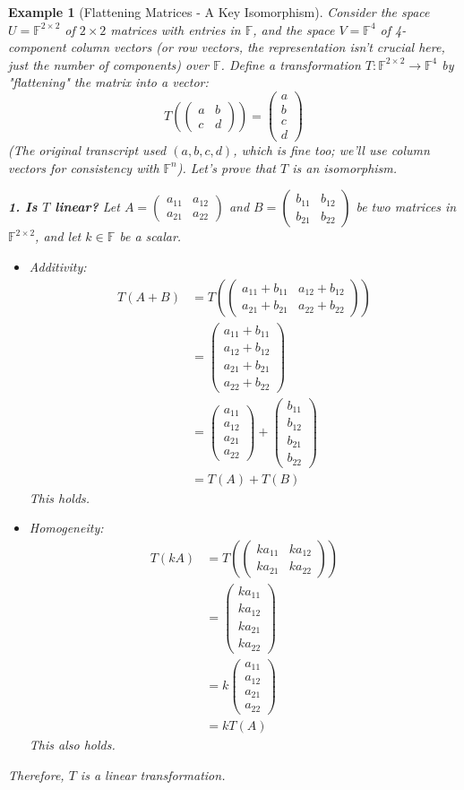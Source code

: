\documentclass[11pt, letterpaper]{article}
\theoremstyle{mytheoremstyle}
\theoremstyle{mydefinitionstyle}
\newtheorem{example}[theorem]{Example}
\theoremstyle{myremarkstyle}
\newcommand{\F}{\mathbb{F}}
\newcommand{\mat}[1]{\begin{pmatrix}#1\end{pmatrix}} %
\begin{document}
\begin{example}[Flattening Matrices - A Key Isomorphism]
Consider the space $U = \F^{2 \times 2}$ of $2 \times 2$ matrices with entries in $\F$, and the space $V = \F^4$ of 4-component column vectors (or row vectors, the representation isn't crucial here, just the number of components) over $\F$. Define a transformation $T: \F^{2 \times 2} \to \F^4$ by "flattening" the matrix into a vector:
\[ T\left( \mat{a & b \\ c & d} \right) = \begin{pmatrix} a \\ b \\ c \\ d \end{pmatrix} \]
(The original transcript used $(a, b, c, d)$, which is fine too; we'll use column vectors for consistency with $\F^n$). Let's prove that $T$ is an isomorphism.

\textbf{1. Is $T$ linear?}
Let $A = \mat{a_{11} & a_{12} \\ a_{21} & a_{22}}$ and $B = \mat{b_{11} & b_{12} \\ b_{21} & b_{22}}$ be two matrices in $\F^{2 \times 2}$, and let $k \in \F$ be a scalar.
\begin{itemize}
    \item Additivity:
    \begin{align*} T(A+B) &= T\left( \mat{a_{11}+b_{11} & a_{12}+b_{12} \\ a_{21}+b_{21} & a_{22}+b_{22}} \right) \\ &= \mat{a_{11}+b_{11} \\ a_{12}+b_{12} \\ a_{21}+b_{21} \\ a_{22}+b_{22}} \\ &= \mat{a_{11} \\ a_{12} \\ a_{21} \\ a_{22}} + \mat{b_{11} \\ b_{12} \\ b_{21} \\ b_{22}} \\ &= T(A) + T(B) \end{align*}
    This holds.
    \item Homogeneity:
    \begin{align*} T(kA) &= T\left( \mat{ka_{11} & ka_{12} \\ ka_{21} & ka_{22}} \right) \\ &= \mat{ka_{11} \\ ka_{12} \\ ka_{21} \\ ka_{22}} \\ &= k \mat{a_{11} \\ a_{12} \\ a_{21} \\ a_{22}} \\ &= k T(A) \end{align*}
    This also holds.
\end{itemize}
Therefore, $T$ is a linear transformation.


\end{example}
\end{document}
